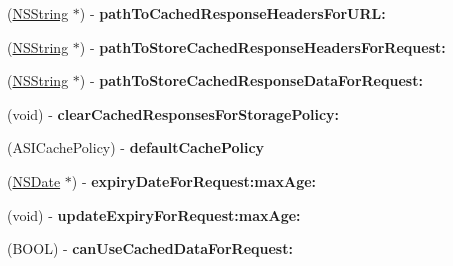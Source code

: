 \begin{DoxyCompactItemize}
\item 
\hypertarget{protocol_a_s_i_cache_delegate-p_a0cab288cf23b1d6adb76981ed591d324}{
(\hyperlink{class_n_s_string}{\-N\-S\-String} $\ast$) -\/ {\bfseries path\-To\-Cached\-Response\-Headers\-For\-U\-R\-L\-:}}
\label{protocol_a_s_i_cache_delegate-p_a0cab288cf23b1d6adb76981ed591d324}

\item 
\hypertarget{protocol_a_s_i_cache_delegate-p_ab9a190279d92a9fc5d7efeff1efad0ad}{
(\hyperlink{class_n_s_string}{\-N\-S\-String} $\ast$) -\/ {\bfseries path\-To\-Store\-Cached\-Response\-Headers\-For\-Request\-:}}
\label{protocol_a_s_i_cache_delegate-p_ab9a190279d92a9fc5d7efeff1efad0ad}

\item 
\hypertarget{protocol_a_s_i_cache_delegate-p_ab7f2a212c2d6391b1d9fb7a8da9f2c39}{
(\hyperlink{class_n_s_string}{\-N\-S\-String} $\ast$) -\/ {\bfseries path\-To\-Store\-Cached\-Response\-Data\-For\-Request\-:}}
\label{protocol_a_s_i_cache_delegate-p_ab7f2a212c2d6391b1d9fb7a8da9f2c39}

\item 
\hypertarget{protocol_a_s_i_cache_delegate-p_abb2c511be4be2274bd3e812ea978e2a6}{
(void) -\/ {\bfseries clear\-Cached\-Responses\-For\-Storage\-Policy\-:}}
\label{protocol_a_s_i_cache_delegate-p_abb2c511be4be2274bd3e812ea978e2a6}

\item 
\hypertarget{protocol_a_s_i_cache_delegate-p_a1207aea079945294e7bb48c621d82a67}{
(\-A\-S\-I\-Cache\-Policy) -\/ {\bfseries default\-Cache\-Policy}}
\label{protocol_a_s_i_cache_delegate-p_a1207aea079945294e7bb48c621d82a67}

\item 
\hypertarget{protocol_a_s_i_cache_delegate-p_a36d0b83c9017dba94a93acc3cae9aa65}{
(\hyperlink{class_n_s_date}{\-N\-S\-Date} $\ast$) -\/ {\bfseries expiry\-Date\-For\-Request\-:max\-Age\-:}}
\label{protocol_a_s_i_cache_delegate-p_a36d0b83c9017dba94a93acc3cae9aa65}

\item 
\hypertarget{protocol_a_s_i_cache_delegate-p_ad793f424847f6f7a2c5154fb8cec1bb6}{
(void) -\/ {\bfseries update\-Expiry\-For\-Request\-:max\-Age\-:}}
\label{protocol_a_s_i_cache_delegate-p_ad793f424847f6f7a2c5154fb8cec1bb6}

\item 
\hypertarget{protocol_a_s_i_cache_delegate-p_a7cf0deb09983a6b552fd7a2130529c95}{
(\-B\-O\-O\-L) -\/ {\bfseries can\-Use\-Cached\-Data\-For\-Request\-:}}
\label{protocol_a_s_i_cache_delegate-p_a7cf0deb09983a6b552fd7a2130529c95}


\end{DoxyCompactItemize}
